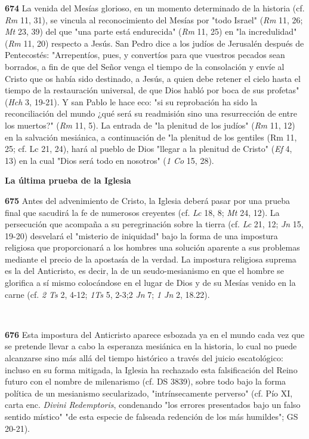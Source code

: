\documentclass[]{article}
\begin{document}
\textbf{674} La venida del Mesías glorioso, en un momento determinado de la historia (cf. \emph{Rm} 11, 31), se vincula al reconocimiento del Mesías por "todo Israel" (\emph{Rm} 11, 26; \emph{Mt} 23, 39) del que "una parte está endurecida" (\emph{Rm} 11, 25) en "la incredulidad" (\emph{Rm} 11, 20) respecto a Jesús. San Pedro dice a los judíos de Jerusalén después de Pentecostés: "Arrepentíos, pues, y convertíos para que vuestros pecados sean borrados, a fin de que del Señor venga el tiempo de la consolación y envíe al Cristo que os había sido destinado, a Jesús, a quien debe retener el cielo hasta el tiempo de la restauración universal, de que Dios habló por boca de sus profetas" (\emph{Hch} 3, 19-21). Y san Pablo le hace eco: "si su reprobación ha sido la reconciliación del mundo ¿qué será su readmisión sino una resurrección de entre los muertos?" (\emph{Rm} 11, 5). La entrada de "la plenitud de los judíos" (\emph{Rm} 11, 12) en la salvación mesiánica, a continuación de "la plenitud de los gentiles (Rm 11, 25; cf. Lc 21, 24), hará al pueblo de Dios "llegar a la plenitud de Cristo" (\emph{Ef} 4, 13) en la cual "Dios será todo en nosotros" (\emph{1 Co} 15, 28).

\textbf{La última prueba de la Iglesia}

\textbf{675} Antes del advenimiento de Cristo, la Iglesia deberá pasar por una prueba final que sacudirá la fe de numerosos creyentes (cf. \emph{Lc} 18, 8; \emph{Mt} 24, 12). La persecución que acompaña a su peregrinación sobre la tierra (cf. \emph{Lc} 21, 12; \emph{Jn} 15, 19-20) desvelará el "misterio de iniquidad" bajo la forma de una impostura religiosa que proporcionará a los hombres una solución aparente a sus problemas mediante el precio de la apostasía de la verdad. La impostura religiosa suprema es la del Anticristo, es decir, la de un seudo-mesianismo en que el hombre se glorifica a sí mismo colocándose en el lugar de Dios y de su Mesías venido en la carne (cf. \emph{2 Ts} 2, 4-12; \emph{1Ts} 5, 2-3;2 \emph{Jn} 7; \emph{1 Jn} 2, 18.22).

\textbf{\\ }

\textbf{676} Esta impostura del Anticristo aparece esbozada ya en el mundo cada vez que se pretende llevar a cabo la esperanza mesiánica en la historia, lo cual no puede alcanzarse sino más allá del tiempo histórico a través del juicio escatológico: incluso en su forma mitigada, la Iglesia ha rechazado esta falsificación del Reino futuro con el nombre de milenarismo (cf. DS 3839), sobre todo bajo la forma política de un mesianismo secularizado, "intrínsecamente perverso" (cf. Pío XI, carta enc. \emph{Divini Redemptoris}, condenando "los errores presentados bajo un falso sentido místico" "de esta especie de falseada redención de los más humildes"; GS 20-21).
\end{document}
